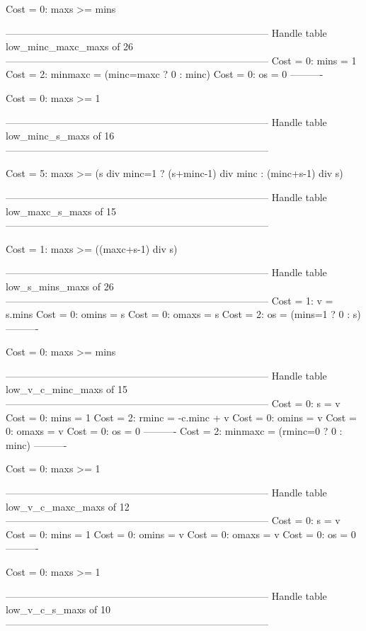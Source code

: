 Cost =  0:  maxs >= mins

--------------------------------------------------------------------------------
Handle table low_minc_maxc_maxs of 26
--------------------------------------------------------------------------------
Cost =  0:  mins    = 1
Cost =  2:  minmaxc = (minc=maxc ? 0 : minc)
Cost =  0:  os      = 0
----------

Cost =  0:  maxs >= 1

--------------------------------------------------------------------------------
Handle table low_minc_s_maxs of 16
--------------------------------------------------------------------------------

Cost =  5:  maxs >= (s div minc=1 ? (s+minc-1) div minc : (minc+s-1) div s)

--------------------------------------------------------------------------------
Handle table low_maxc_s_maxs of 15
--------------------------------------------------------------------------------

Cost =  1:  maxs >= ((maxc+s-1) div s)

--------------------------------------------------------------------------------
Handle table low_s_mins_maxs of 26
--------------------------------------------------------------------------------
Cost =  1:  v     = s.mins
Cost =  0:  omins = s
Cost =  0:  omaxs = s
Cost =  2:  os    = (mins=1 ? 0 : s)
----------

Cost =  0:  maxs >= mins

--------------------------------------------------------------------------------
Handle table low_v_c_minc_maxs of 15
--------------------------------------------------------------------------------
Cost =  0:  s       = v
Cost =  0:  mins    = 1
Cost =  2:  rminc   = -c.minc + v
Cost =  0:  omins   = v
Cost =  0:  omaxs   = v
Cost =  0:  os      = 0
----------
Cost =  2:  minmaxc = (rminc=0 ? 0 : minc)
----------

Cost =  0:  maxs >= 1

--------------------------------------------------------------------------------
Handle table low_v_c_maxc_maxs of 12
--------------------------------------------------------------------------------
Cost =  0:  s     = v
Cost =  0:  mins  = 1
Cost =  0:  omins = v
Cost =  0:  omaxs = v
Cost =  0:  os    = 0
----------

Cost =  0:  maxs >= 1

--------------------------------------------------------------------------------
Handle table low_v_c_s_maxs of 10
--------------------------------------------------------------------------------

